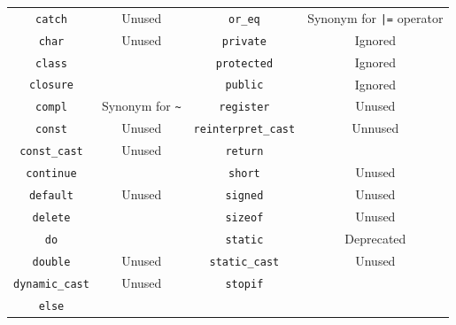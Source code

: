 \documentclass[openright,twoside,12pt]{report}
\begin{document}
\begin{table}[htp]
\begin{tabular}{|c|c||c|c|}
    \lstinline"catch"             & Unused                                  &
    \lstinline"or_eq"             & Synonym for \lstinline-|=- operator     \\
    \lstinline"char"              & Unused                                  &
    \lstinline"private"           & Ignored                                 \\
    \lstinline"class"             &                                         &
    \lstinline"protected"         & Ignored                                 \\
    \lstinline"closure"           &                                         &
    \lstinline"public"            & Ignored                                 \\
    \lstinline"compl"             & Synonym for \lstinline|~|               &
    \lstinline"register"          & Unused                                  \\
    \lstinline"const"             & Unused                                  &
    \lstinline"reinterpret_cast"  & Unnused                                 \\
    \lstinline"const_cast"        & Unused                                  &
    \lstinline"return"            &                                         \\
    \lstinline"continue"          &                                         &
    \lstinline"short"             & Unused                                  \\
    \lstinline"default"           & Unused                                  &
    \lstinline"signed"            & Unused                                  \\
    \lstinline"delete"            &                                         &
    \lstinline"sizeof"            & Unused                                  \\
    \lstinline"do"                &                                         &
    \lstinline"static"            & Deprecated                              \\
    \lstinline"double"            & Unused                                  &
    \lstinline"static_cast"       & Unused                                  \\
    \lstinline"dynamic_cast"      & Unused                                  &
    \lstinline"stopif"            &                                         \\
    \lstinline"else"              &                                         &

\end{tabular}
\end{table}
\end{document}
